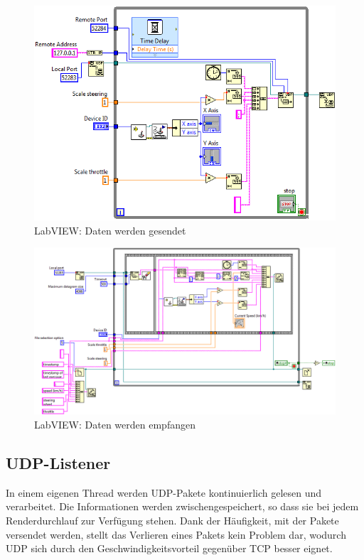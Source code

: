 \begin{figure}[H]
\centering 
\includegraphics[width=1\linewidth]{src/labview_screenshot_drivingsimulator_daten_senden.png}
\caption{LabVIEW: Daten werden gesendet} %
\label{labview_daten_senden} %
\end{figure}

\newpage
\begin{figure}[H]
\centering 
\includegraphics[angle=90,width=0.8\linewidth]{src/labview_screenshot_drivingsimulator_daten_empfangen.png}
\caption{LabVIEW: Daten werden empfangen} %
\label{labview_daten_empfangen} %
\end{figure}

\newpage
\subsection{UDP-Listener}
\label{sec:udp-listener}
In einem eigenen Thread werden UDP-Pakete kontinuierlich gelesen und verarbeitet. Die Informationen werden zwischengespeichert, so dass sie bei jedem Renderdurchlauf zur Verfügung stehen. Dank der Häufigkeit, mit der Pakete versendet werden, stellt das Verlieren eines Pakets kein Problem dar, wodurch UDP sich durch den Geschwindigkeitsvorteil gegenüber TCP besser eignet.

